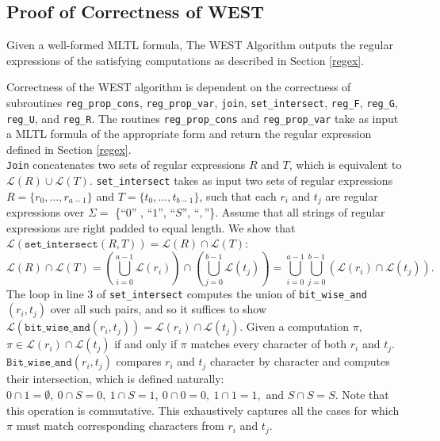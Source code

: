 \documentclass[runningheads]{llncs}
\begin{document}
\subsection{Proof of Correctness of WEST}
\begin{theorem} \label{theocorrect}
  Given a well-formed MLTL formula, The WEST Algorithm outputs the regular expressions of the satisfying computations as described in Section \ref{regex}.
\end{theorem}
Correctness of the WEST algorithm is dependent on the correctness of subroutines \texttt{reg\_prop\_cons}, \texttt{reg\_prop\_var}, \texttt{join}, \texttt{set\_intersect}, \texttt{reg\_F}, \texttt{reg\_G}, \texttt{reg\_U}, and \texttt{reg\_R}. 
The routines \texttt{reg\_prop\_cons} and \texttt{reg\_prop\_var} take as input a MLTL formula of the appropriate form and return the regular expression defined in Section \ref{regex}.\\
\texttt{Join} concatenates two sets of regular expressions $R$ and $T$, which is equivalent to $\mathscr{L}(R) \cup \mathscr{L}(T)$. \texttt{set\_intersect} takes as input two sets of regular expressions $R = \{r_0, ..., r_{a-1}\}$ and $T = \{t_0, ..., t_{b-1}\}$, such that each $r_i$
and $t_j$ are regular expressions over $\Sigma =$ \{``$0$'' , ``$1$'', ``$S$'', ``$,$''\}.
Assume that all strings of regular expressions are right padded to equal length. 
We show that $\mathscr{L}(\texttt{set\_intersect}(R, T)) = \mathscr{L}(R) \cap \mathscr{L}(T)$:
\vspace{-3mm}$$\mathscr{L}(R) \cap \mathscr{L}(T) = \left(\bigcup_{i = 0}^{a-1} \mathscr{L}(r_i) \right)\cap \left( \bigcup_{j = 0}^{b-1} \mathscr{L}(t_j)\right) = \bigcup_{i = 0}^{a-1} \bigcup_{j = 0}^{b-1} \left(\mathscr{L}(r_i) \cap \mathscr{L}(t_j)\right).$$
The loop in line 3 of \texttt{set\_intersect} computes the union of \texttt{bit\_wise\_and}$(r_i, t_j)$ over all such pairs, and so it suffices to show $\mathscr{L}(\texttt{bit\_wise\_and}(r_i, t_j)) = \mathscr{L}(r_i) \cap \mathscr{L}(t_j)$.  
Given a computation $\pi$, $\pi \in \mathscr{L}(r_i) \cap \mathscr{L}(t_j)$ if and only if $\pi$ matches every character of both $r_i$ and $t_j$. 
$\texttt{Bit\_wise\_and}(r_i, t_j)$ compares $r_i$ and $t_j$ character by character and computes their intersection, which is defined naturally: $0 \cap 1 = \emptyset,\ 0 \cap S = 0,\ 1 \cap S = 1, \ 0 \cap 0 = 0, \ 1 \cap 1= 1,\text{ and } S \cap S = S$. 
Note that this operation is commutative. This exhaustively captures all the cases for which $\pi$ must match corresponding characters from $r_i$ and $t_j$. 
\end{document}
